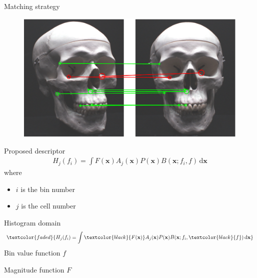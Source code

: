 \documentclass[14pt,t]{beamer}
\def\x{\mathbf{x}}
\begin{document}
\begin{frame}{Matching strategy}
\begin{figure}
\centering
	\includegraphics[width=\textwidth]{img/imageCorrespondenceExample3.pdf}
\end{figure}
\end{frame}
%
\begin{frame}{Proposed descriptor}
\begin{align*}
H_j(f_i) = \int F(\x) A_j (\x) P (\x) B(\x; f_i,f) \,\text{d} \x
\end{align*}
where
\begin{itemize}
\item[] $i$ is the bin number
\item[] $j$ is the cell number
\end{itemize}
\end{frame}
%
\begin{frame}{Histogram domain}
\begin{align*}
\textcolor{faded}{H_j(f_i) = \int \textcolor{black}{F(\x)} A_j (\x) P (\x) B(\x; f_i,\textcolor{black}{f}) \,\text{d} \x}
\end{align*}
Bin value function $f$

Magnitude function $F$
\end{frame}
%
\end{document}
